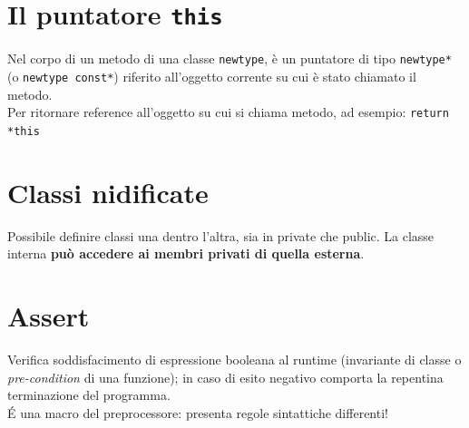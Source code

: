 \documentclass[10pt, oneside]{book}
\begin{document}
\section{Il puntatore \texttt{this}}
Nel corpo di un metodo di una classe \texttt{newtype}, è un puntatore di tipo \texttt{newtype*} (o \texttt{newtype const*}) riferito all'oggetto corrente su cui è stato chiamato il metodo.\\
Per ritornare reference all'oggetto su cui si chiama metodo, ad esempio: \texttt{return *this}

\section{Classi nidificate}
Possibile definire classi una dentro l'altra, sia in private che public. La classe interna \textbf{può accedere ai membri privati di quella esterna}.

\section{Assert}
Verifica soddisfacimento di espressione booleana al runtime (invariante di classe o \textit{pre-condition} di una funzione); in caso di esito negativo comporta la repentina terminazione del programma.\\
\'E una macro del preprocessore: presenta regole sintattiche differenti!
\end{document}
